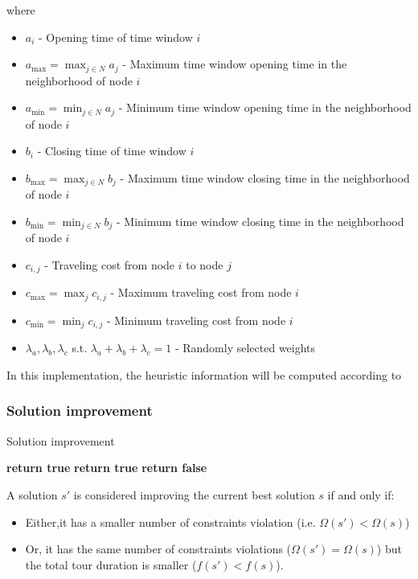 \begin{homeworkProblem}
where
\begin{itemize}
  \item $a_i$ - Opening time of time window $i$
  \item $a_{\max} = \max_{j \in N} a_{j}$ - Maximum time window opening time in the neighborhood of node $i$
  \item $a_{\min} = \min_{j \in N} a_{j}$ - Minimum time window opening time in the neighborhood of node $i$
  \item $b_i$ - Closing time of time window $i$
  \item $b_{\max} = \max_{j \in N} b_{j}$ - Maximum time window closing time in the neighborhood of node $i$
  \item $b_{\min} = \min_{j \in N} b_{j}$ - Minimum time window closing time in the neighborhood of node $i$
  \item $c_{i,j}$ - Traveling cost from node $i$ to node $j$
  \item $c_{\max} = \max_j c_{i,j}$ - Maximum traveling cost from node $i$ 
  \item $c_{\min} = \min_j c_{i,j}$ - Minimum traveling cost from node $i$
  \item $\lambda_{a},\lambda_{b},\lambda_{c}$ s.t. $\lambda_{a}+\lambda_{b}+\lambda_{c}=1$ - Randomly selected weights
\end{itemize}

In this implementation, the heuristic information will be computed according to \cite{lopez2010beam}

\subsubsection{Solution improvement}
\begin{algorithm}[!h]
  \caption{Solution improvement}\label{solImprov}
  \begin{algorithmic}[1]
          \State \textbf{return true}
      \Else
            \State \textbf{return true}
           \EndIf
      \EndIf
      \State \textbf{return false}
      \EndProcedure
\end{algorithmic}
\end{algorithm}

A solution $s'$ is considered improving the current best solution $s$ if and only if:
\begin{itemize}
  \item Either,it has a smaller number of constraints violation (i.e. $\Omega(s') < \Omega(s)$)
  \item Or, it has the same number of constraints violations ($\Omega(s') = \Omega(s)$) but the total tour duration is smaller ($f(s') < f(s)$).
\end{itemize}



\end{homeworkProblem}
